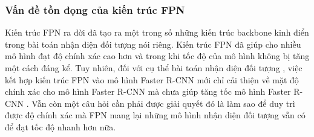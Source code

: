 {    \subsubsection*{Vấn đề tồn đọng của kiến trúc FPN}
    Kiến trúc FPN ra đời đã tạo ra một trong số những kiến trúc backbone  kinh điển trong bài toán nhận diện đối tượng  nói riêng.
    Kiến trúc FPN đã giúp cho nhiều mô hình đạt độ chính xác cao hơn và trong khi tốc độ của mô hình không bị tăng một cách đáng kể.
    Tuy nhiên, đối với cụ thể bài toán nhận diện đối tượng , việc kết hợp kiến trúc FPN vào mô hình Faster R-CNN  mới chỉ cải thiện về mặt độ chính xác cho mô hình Faster R-CNN  mà chưa giúp tăng tốc mô hình Faster R-CNN .
    Vẫn còn một câu hỏi cần phải được giải quyết đó là làm sao để duy trì được độ chính xác mà FPN mang lại những mô hình nhận diện đối tượng  vẫn có để đạt tốc độ nhanh hơn nữa.
}